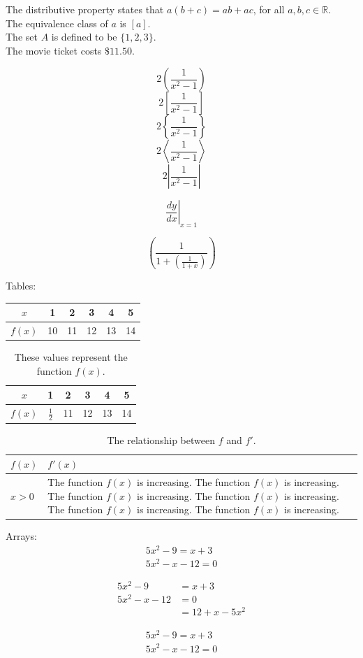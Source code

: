 \documentclass[11pt]{article}
\begin{document}
The distributive property states that $a(b+c) = ab + ac$, for all $a, b, c \in \mathbb{R}$.\\[6pt]
The equivalence class of $a$ is $[a]$.\\[6pt]
The set $A$ is defined to be $\{1, 2, 3\}$.\\[6pt]
The movie ticket costs $\$11.50$.

$$2\left(\frac{1}{x^2-1}\right)$$
$$2\left[\frac{1}{x^2-1}\right]$$
$$2\left\{\frac{1}{x^2-1}\right\}$$
$$2\left \langle \frac{1}{x^2-1}\right \rangle$$
$$2\left | \frac{1}{x^2-1}\right |$$

$$\left. \frac{dy}{dx}\right |_{x=1}$$

$$\left ( \frac{1}{1 + \left ( \frac{1}{1+x} \right )} \right )$$

Tables:\\[16pt]
\begin{tabular}{|c||c|c|c|c|c|}
\hline
$x$ & 1 & 2 & 3 & 4 & 5 \\ \hline
$f(x)$ & 10 & 11 & 12 & 13 & 14 \\ \hline
\end{tabular}

\vspace{1cm}

\begin{table}[H]
\centering
\def\arraystretch{1.5}
\begin{tabular}{|c||c|c|c|c|c|}
\hline
$x$ & 1 & 2 & 3 & 4 & 5 \\ \hline
$f(x)$ & $\frac{1}{2}$ & 11 & 12 & 13 & 14 \\ \hline
\end{tabular}
\caption{These values represent the function $f(x)$.}
\end{table}

\begin{table}[H]
\centering
\caption{The relationship between $f$ and $f'$.}
\def\arraystretch{1.5}
\begin{tabular}{|l|p{3in}|}
\hline
$f(x)$ & $f'(x)$ \\ \hline
$x>0$ & The function $f(x)$ is increasing. The function $f(x)$ is increasing. The function $f(x)$ is increasing. The function $f(x)$ is increasing. The function $f(x)$ is increasing. The function $f(x)$ is increasing. \\ \hline
\end{tabular}
\end{table}

Arrays:
\begin{align}
5x^2-9=x+3\\
5x^2-x-12=0
\end{align}

\begin{align*}
5x^2-9&=x+3\\
5x^2-x-12&=0\\
&=12+x-5x^2
\end{align*}

\begin{align}
5x^2-9=x+3\\
5x^2-x-12=0
\end{align}
\end{document}
